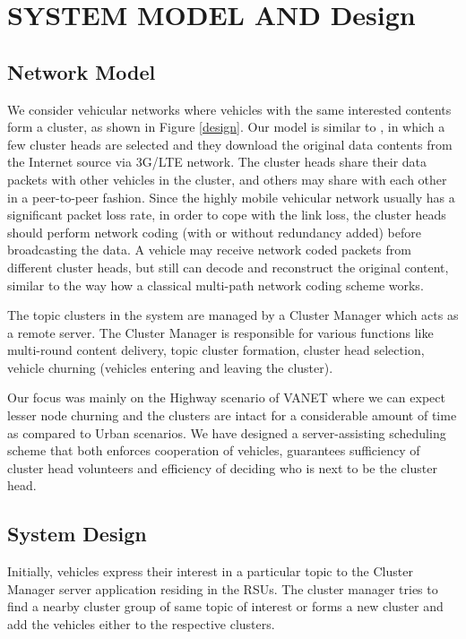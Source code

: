 \documentclass{acm_proc_article-sp}
\begin{document}
\section{ SYSTEM MODEL AND Design}
\vspace{1 mm}

\subsection{Network Model}
\vspace{1 mm}
We consider vehicular networks where vehicles with the same interested contents form a cluster, as shown in Figure \ref{design}. Our model is similar to \cite{game}, in which a few cluster heads are selected and they download the original data contents from the Internet source via 3G/LTE network. The cluster heads share their data packets with other vehicles in the cluster, and others may share with each other in a peer-to-peer fashion. Since the highly mobile vehicular network usually has a significant packet loss rate, in order to cope with the link loss, the cluster heads should perform network coding (with or without redundancy added) before broadcasting the data. A vehicle may receive network coded packets from different cluster heads, but still can decode and reconstruct the original content, similar to the way how a classical multi-path network coding scheme works.

The topic clusters in the system are managed by a Cluster Manager which acts as a remote server. The Cluster Manager is responsible for various functions like multi-round content delivery, topic cluster formation, cluster head selection, vehicle churning (vehicles entering and leaving the cluster). 

Our focus was mainly on the Highway scenario of VANET where we can expect lesser node churning and the clusters are intact for a considerable amount of time as compared to Urban scenarios. We have designed a server-assisting scheduling scheme that both enforces cooperation of vehicles, guarantees sufficiency of cluster head volunteers and efficiency of deciding who is next to be the cluster head. 

\subsection{System Design}
\vspace{1 mm}
Initially, vehicles express their interest in a particular topic to the Cluster Manager server application residing in the RSUs. The cluster manager tries to find a nearby cluster group of same topic of interest or forms a new cluster and add the vehicles either to the respective clusters. 
\end{document}
